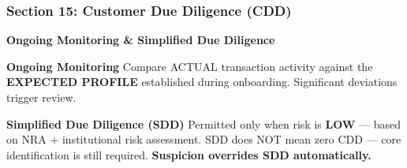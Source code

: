 \documentclass[12pt,aspectratio=169]{beamer}
\renewcommand{\scriptsize}{\fontsize{5}{6}\selectfont}
\begin{document}
	\begin{frame}
		\frametitle{\fontsize{13}{15}\selectfont \textbf{Section 15: Customer Due Diligence (CDD)}}
		\vspace{0.3cm}
		\begin{center}
			{\fontsize{12}{14}\selectfont \textbf{Ongoing Monitoring \& Simplified Due Diligence}}
		\end{center}
		\vspace{0.2cm}
		\begin{block}{\textbf{Ongoing Monitoring}}
			\scriptsize
			Compare ACTUAL transaction activity against the \textbf{EXPECTED PROFILE} established during onboarding. Significant deviations trigger review.
		\end{block}
		\vspace{0.1cm}
		\begin{block}{\textbf{Simplified Due Diligence (SDD)}}
			\scriptsize
			Permitted only when risk is \textbf{LOW} — based on NRA + institutional risk assessment. SDD does NOT mean zero CDD — core identification is still required. \textbf{Suspicion overrides SDD automatically.}
		\end{block}
	\end{frame}
	
\end{document}
